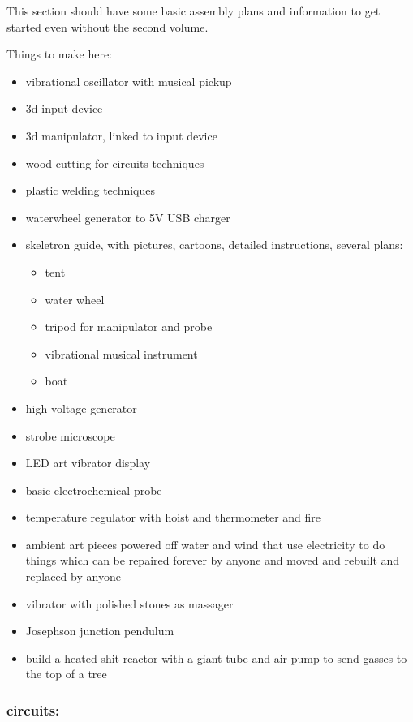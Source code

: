 This section should have some basic assembly plans and information to
get started even without the second volume.

Things to make here:

\begin{itemize}
\tightlist
\item
  vibrational oscillator with musical pickup
\item
  3d input device
\item
  3d manipulator, linked to input device
\item
  wood cutting for circuits techniques
\item
  plastic welding techniques
\item
  waterwheel generator to 5V USB charger
\item
  skeletron guide, with pictures, cartoons, detailed instructions,
  several plans:

  \begin{itemize}
  \tightlist
  \item
    tent
  \item
    water wheel
  \item
    tripod for manipulator and probe
  \item
    vibrational musical instrument
  \item
    boat
  \end{itemize}
\item
  high voltage generator
\item
  strobe microscope
\item
  LED art vibrator display
\item
  basic electrochemical probe
\item
  temperature regulator with hoist and thermometer and fire
\item
  ambient art pieces powered off water and wind that use electricity to
  do things which can be repaired forever by anyone and moved and
  rebuilt and replaced by anyone
\item
  vibrator with polished stones as massager
\item
  Josephson junction pendulum
\item
  build a heated shit reactor with a giant tube and air pump to send
  gasses to the top of a tree
\end{itemize}

\subsubsection{circuits:}\label{circuits}


